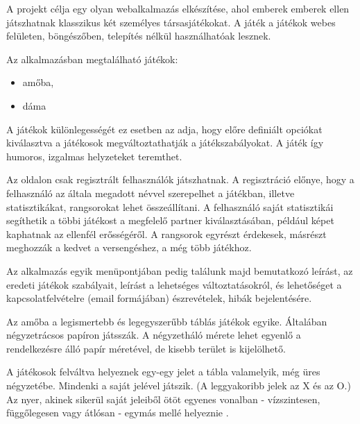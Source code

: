 



A projekt célja egy olyan webalkalmazás elkészítése, ahol emberek emberek ellen játszhatnak klasszikus két személyes társasjátékokat. A játék a játékok webes felületen, böngészőben, telepítés nélkül használhatóak lesznek.

Az alkalmazásban megtalálható játékok:
\begin{itemize}
	\item amőba,
	\item dáma
\end{itemize}

A játékok különlegességét ez esetben az adja, hogy előre definiált opciókat kiválasztva a játékosok megváltoztathatják a játékszabályokat. A játék így humoros, izgalmas helyzeteket teremthet.

Az oldalon csak regisztrált felhasználók játszhatnak. A regisztráció előnye, hogy a felhasználó az általa megadott névvel szerepelhet a játékban, illetve statisztikákat, rangsorokat lehet összeállítani. A felhasználó saját statisztikái segíthetik a többi játékost a megfelelő partner kiválasztásában, például képet kaphatnak az ellenfél erősségéről. A rangsorok egyrészt érdekesek, másrészt meghozzák a kedvet a versengéshez, a még több játékhoz.

Az alkalmazás egyik menüpontjában pedig találunk majd bemutatkozó leírást, az eredeti játékok szabályait, leírást a lehetséges változtatásokról, és lehetőséget a kapcsolatfelvételre (email formájában) észrevételek, hibák bejelentésére. 



Az amőba a legismertebb és legegyszerűbb táblás játékok egyike. Általában négyzetrácsos papíron játsszák. A négyzetháló mérete lehet egyenlő a rendelkezésre álló papír méretével, de kisebb terület is kijelölhető.

A játékosok felváltva helyeznek egy-egy jelet a tábla valamelyik, még üres négyzetébe. Mindenki a saját jelével játszik. (A leggyakoribb jelek az X és az O.) Az nyer, akinek sikerül saját jeleiből ötöt egyenes vonalban - vízszintesen, függőlegesen vagy átlósan - egymás mellé helyeznie \cite{fiveinarow-rules}.

